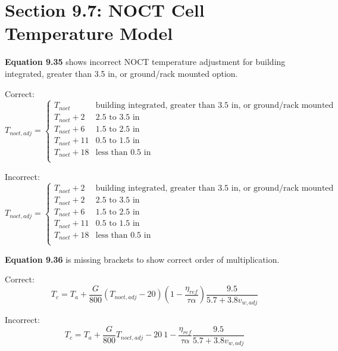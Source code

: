 \documentclass[report]{nrel}
\begin{document}
\section*{Section 9.7: NOCT Cell Temperature Model}

\textbf{Equation 9.35} shows incorrect NOCT temperature adjustment for building integrated, greater than 3.5 in, or ground/rack mounted option.

Correct:
\begin{equation*}
T_{noct,adj} =\left\{
\begin{array}{ll}
T_{noct}  & \text{building integrated, greater than 3.5 in, or ground/rack mounted}\\
T_{noct} + 2 & \text{2.5 to 3.5 in} \\
T_{noct} + 6 & \text{1.5 to 2.5 in} \\
T_{noct} + 11 & \text{0.5 to 1.5 in} \\
T_{noct} + 18 & \text{less than 0.5 in} \\
\end{array}
\right.
\end{equation*}

Incorrect:
\begin{equation*}
T_{noct,adj} =\left\{
\begin{array}{ll}
T_{noct} + 2  & \text{building integrated, greater than 3.5 in, or ground/rack mounted}\\
T_{noct} + 2 & \text{2.5 to 3.5 in} \\
T_{noct} + 6 & \text{1.5 to 2.5 in} \\
T_{noct} + 11 & \text{0.5 to 1.5 in} \\
T_{noct} + 18 & \text{less than 0.5 in} \\
\end{array}
\right.
\end{equation*}

\textbf{Equation 9.36} is missing brackets to show correct order of multiplication.

Correct:
\begin{equation*}
T_c = T_a + \frac{G}{800} \left(T_{noct,adj} - 20 \right) \left(1-\frac{\eta_{ref}}{\tau \alpha}\right) \frac{9.5}{5.7+3.8v_{w,adj}}
\end{equation*}

Incorrect:
\begin{equation*}
T_c = T_a + \frac{G}{800} T_{noct,adj} - 20~ 1-\frac{\eta_{ref}}{\tau \alpha} \frac{9.5}{5.7+3.8v_{w,adj}}
\end{equation*}
\end{document}
